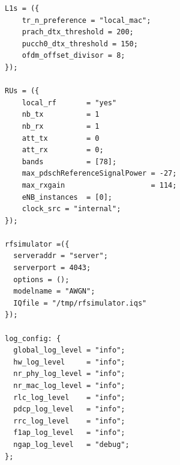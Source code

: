 \begin{lstlisting}[style=confstyle, caption=DU0 band78 PCI 0 Configuration]
L1s = ({
    tr_n_preference = "local_mac";
    prach_dtx_threshold = 200;
    pucch0_dtx_threshold = 150;
    ofdm_offset_divisor = 8;
});

RUs = ({
    local_rf       = "yes"
    nb_tx          = 1
    nb_rx          = 1
    att_tx         = 0
    att_rx         = 0;
    bands          = [78];
    max_pdschReferenceSignalPower = -27;
    max_rxgain                    = 114;
    eNB_instances  = [0];
    clock_src = "internal";
});

rfsimulator =({
  serveraddr = "server";
  serverport = 4043;
  options = ();
  modelname = "AWGN";
  IQfile = "/tmp/rfsimulator.iqs"
});

log_config: {
  global_log_level = "info";
  hw_log_level     = "info";
  nr_phy_log_level = "info";
  nr_mac_log_level = "info";
  rlc_log_level    = "info";
  pdcp_log_level   = "info";
  rrc_log_level    = "info";
  f1ap_log_level   = "info";
  ngap_log_level   = "debug";
};
\end{lstlisting}

\newpage
